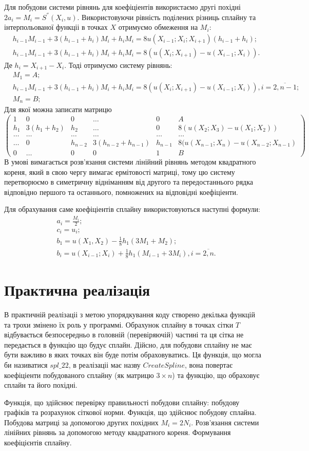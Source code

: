 \documentclass[titlepage]{article}
\newcommand\makelisting[1]{\begingroup\spacing{1} \vspace{1cm} \endgroup}
\newcommand\mysection[1]{\begingroup\center\section*{#1}\endgroup}
\newcommand\eq[1]{\begin{equation*}\begin{split}#1\end{split}\end{equation*}}
\begin{document}
Для побудови системи рівнянь для коефіціентів використаємо другі похідні $2a_i = M_i = S^{''}(X_i, u)$. Використовуючи рівність поділених різниць сплайну та інтерпольованої функціі в точках $X$ отримуємо обмеження на $M_i$:
\eq{
&h_{i-1}M_{i-1} + 3(h_{i-1} + h_i)M_i + h_iM_i = 8u(X_{i-1};X_i;X_{i+1})(h_{i-1} + h_i);\\
&h_{i-1}M_{i-1} + 3(h_{i-1} + h_i)M_i + h_iM_i = 8(u(X_i; X_{i+1}) - u(X_{i-1}; X_i)).
}
Де $h_i = X_{i+1} - X_i$. Тоді отримуємо систему рівнянь:
\eq{
&M_1 = A;\\
&h_{i-1}M_{i-1} + 3(h_{i-1} + h_i)M_i + h_iM_i = 8(u(X_i; X_{i+1}) - u(X_{i-1}; X_i)), i = \overline{2,n-1};\\
&M_n = B;
}
Для якої можна записати матрицю
\[\left(\begin{array}{ccccc|c}
1 & 0 & 0 & \ldots & 0 & A\\
h_1 & 3(h_1 + h_2) & h_2 & \ldots& 0  & 8(u(X_2; X_3) - u(X_1; X_2))\\
\ldots &\ldots &\ldots &\ldots &\ldots & \ldots\\
\ldots & 0 &h_{n-2} & 3(h_{n-2} + h_{n- 1}) & h_{n-1} & 8(u(X_{n-1}; X_n) - u(X_{n-2}; X_{n-1})\\
0 & \ldots & 0  & 0 & 1 & B
\end{array}\right)\]
В умові вимагається розв'язання системи лінійний рівнянь методом квадратного кореня, який в свою чергу вимагає ермітовості матриці, тому цю систему перетворюємо в симетричну відніманням від другого та передостаннього рядка відповідно першого та останнього, помножених на відповідні коефіціенти.

Для обрахування саме коефіціентів сплайну використовуються наступні формули:
\eq{
&a_i = \frac{M_i}{2};\\
&c_i = u_i;\\
&b_1 = u(X_1, X_2) - \frac{1}{8}h_1(3M_1 + M_2);\\
&b_i = u(X_{i-1};X_i) + \frac{1}{8}h_1(M_{i-1} + 3M_i), i=\overline{2,n}.
}
\mysection{Практична реалізація}
В практичній реалізаціі з метою упорядкування коду створено декілька функцій та трохи змінено їх роль у программі. Обрахунок сплайну в точках сітки $T$ відбувається безпосередньо в головній (перевіряючій) частині та ця сітка не передається в функцію що будує сплайн. Дійсно, для побудови сплайну не має бути важливо в яких точках він буде потім обраховуватись. Ця функція, що могла би називатися $spl\_22$, в реалізаціі має назву $CreateSpline$, вона повертає коефіціенти побудованого сплайну (як матрицю $3\times n$) та функцію, що обраховує сплайн та його похідні. 

Функція, що здійснює перевірку правильності побудови сплайну: побудову графіків та розрахунок сіткової норми.
\makelisting{main.m}
Функція, що здійснює побудову сплайна.
\makelisting{CreateSpline.m}
Побудова матриці за допомогою других похідних $M_i = 2N_i$.
\makelisting{CreateSEMatrix.m}
Розв'язання системи лінійних рівнянь за допомогою методу квадратного кореня.
\makelisting{SolveSE.m}
Формування коефіцієнтів сплайну.
\makelisting{FormSpline.m}
\end{document}
